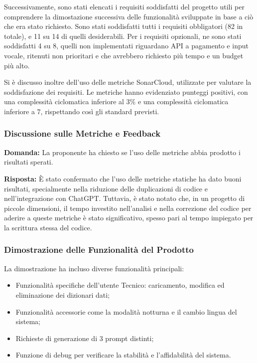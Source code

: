 \par Successivamente, sono stati elencati i requisiti soddisfatti del progetto utili per comprendere la dimostazione successiva delle funzionalità sviluppate in base a ciò che era stato richiesto. Sono stati soddisfatti tutti i requisiti obbligatori (82 in totale), e  11 su 14 di quelli desiderabili. Per i requisiti opzionali, ne sono stati soddisfatti 4 su 8, quelli non implementati riguardano API a pagamento e input vocale, ritenuti non prioritari e che avrebbero richiesto più tempo e un budget più alto.

\par Si è discusso inoltre dell'uso delle metriche SonarCloud, utilizzate per valutare la soddisfazione dei requisiti. Le metriche hanno evidenziato punteggi positivi, con una complessità ciclomatica inferiore al 3\% e una complessità ciclomatica inferiore a 7, rispettando così gli standard previsti.

\subsubsection{Discussione sulle Metriche e Feedback}

\par \textbf{Domanda:} La proponente ha chiesto se l'uso delle metriche abbia prodotto i risultati sperati.

\par \textbf{Risposta:} È stato confermato che l'uso delle metriche statiche ha dato buoni risultati, specialmente nella riduzione delle duplicazioni di codice e nell'integrazione con ChatGPT. Tuttavia, è stato notato che, in un progetto di piccole dimensioni, il tempo investito nell'analisi e nella correzione del codice per aderire a queste metriche è stato significativo, spesso pari al tempo impiegato per la scrittura stessa del codice.

\subsubsection{Dimostrazione delle Funzionalità del Prodotto}

\par La dimostrazione ha incluso diverse funzionalità principali:
\begin{itemize}
    \item Funzionalità specifiche dell'utente Tecnico: caricamento, modifica ed eliminazione dei dizionari dati;
    \item Funzionalità accessorie come la modalità notturna e il cambio lingua del sistema;
    \item Richieste di generazione di 3 prompt distinti; 
    \item Funzione di debug per verificare la stabilità e l'affidabilità del sistema.
\end{itemize}

